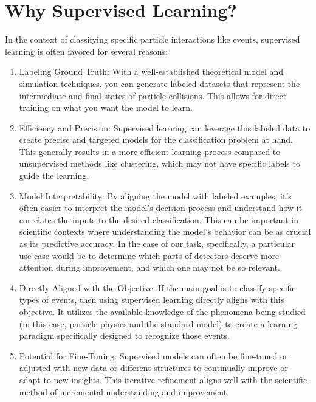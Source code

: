 \section{Why Supervised Learning?}
\label{appendix:why-supervised}

In the context of classifying specific particle interactions like \tth events, supervised learning is often favored for
several reasons:

\begin{enumerate}
    \item Labeling Ground Truth: With a well-established theoretical model and simulation techniques, you can generate
          labeled datasets that represent the intermediate and final states of particle collisions. This allows for
          direct training on what you want the model to learn.

    \item Efficiency and Precision: Supervised learning can leverage this labeled data to create precise and targeted
          models for the classification problem at hand. This generally results in a more efficient learning process
          compared to unsupervised methods like clustering, which may not have specific labels to guide the learning.

    \item Model Interpretability: By aligning the model with labeled examples, it's often easier to interpret the
          model's decision process and understand how it correlates the inputs to the desired classification. This can
          be important in scientific contexts where understanding the model's behavior can be as crucial as its
          predictive accuracy. In the case of our task, specifically, a particular use-case would be to determine which
          parts of detectors deserve more attention during improvement, and which one may not be so relevant.

    \item Directly Aligned with the Objective: If the main goal is to classify specific types of events, then using
          supervised learning directly aligns with this objective. It utilizes the available knowledge of the phenomena
          being studied (in this case, particle physics and the standard model) to create a learning paradigm
          specifically designed to recognize those events.

    \item Potential for Fine-Tuning: Supervised models can often be fine-tuned or adjusted with new data or different
          structures to continually improve or adapt to new insights. This iterative refinement aligns well with the
          scientific method of incremental understanding and improvement.


\end{enumerate}
